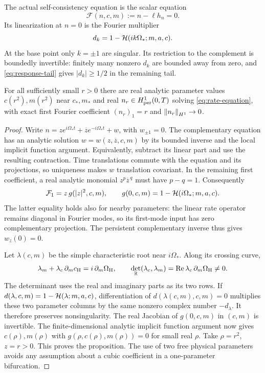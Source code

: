 The actual self-consistency equation is the scalar equation
\begin{equation}\label{eq:rate-equation}
 \mathcal F(n,c,m):=n-\ell h_n=0 .
\end{equation}
Its linearization at $n=0$ is the Fourier multiplier
\[
 d_k=1-\mathcal H(ik\Omega_*;m,a,c).
\]
At the base point only $k=\pm1$ are singular. Its restriction to
the complement is boundedly invertible: finitely many nonzero
$d_k$ are bounded away from zero, and
\eqref{eq:response-tail} gives $|d_k|\ge1/2$ in the remaining tail.

\begin{proposition}\label{prop:rate-branch}
For all sufficiently small $r>0$ there are real analytic parameter
values $c(r^2),m(r^2)$ near $c_*,m_*$ and real
$n_r\in H^1_{\mathrm{per}}(0,T)$ solving \eqref{eq:rate-equation}, with exact
first Fourier coefficient $(n_r)_1=r$ and
$\left\|n_r\right\|_{H^1}\to0$.
\end{proposition}

\begin{proof}
Write
$n=ze^{i\Omega_*t}+\overline z e^{-i\Omega_*t}+w$, with
$w_{\pm1}=0$. The complementary equation has an analytic solution
$w=w(z,\overline z,c,m)$ by its bounded inverse and the local
implicit function argument. Equivalently, subtract its linear part
and use the resulting contraction. Time translations commute with
the equation and its projections, so uniqueness makes $w$
translation covariant. In the remaining first coefficient,
a real analytic monomial $z^p\overline z^{\,q}$ must have $p-q=1$.
Consequently
\begin{equation}\label{eq:reduced-equation}
 \mathcal F_1=z\,g(|z|^2,c,m),\qquad
 g(0,c,m)=1-\mathcal H(i\Omega_*;m,a,c).
\end{equation}
The latter equality holds also for nearby parameters: the linear
rate operator remains diagonal in Fourier modes, so its first-mode
input has zero complementary projection. The persistent
complementary inverse thus gives $w_z(0)=0$.

Let $\lambda(c,m)$ be the simple characteristic root near
$i\Omega_*$. Along its crossing curve,
\[
 \lambda_m+\lambda_c\,\partial_mc_{\mathrm H}=i\,\partial_m\Omega_{\mathrm H},\qquad
 \det_{\mathbb R}(\lambda_c,\lambda_m)
       =\operatorname{Re}\lambda_c\,\partial_m\Omega_{\mathrm H}\ne0.
\]
The determinant uses the real and imaginary parts as its two rows.
If $d(\lambda,c,m)=1-\mathcal H(\lambda;m,a,c)$, differentiation of
$d(\lambda(c,m),c,m)=0$ multiplies these two parameter columns
by the same nonzero complex number $-d_\lambda$. It therefore
preserves nonsingularity. The real Jacobian of $g(0,c,m)$ in
$(c,m)$ is invertible. The finite-dimensional analytic implicit
function argument now gives $c(\rho),m(\rho)$ with
$g(\rho,c(\rho),m(\rho))=0$ for small real $\rho$.
Take $\rho=r^2$, $z=r>0$. This proves the proposition.
The use of two free physical parameters avoids any assumption
about a cubic coefficient in a one-parameter bifurcation.
\end{proof}


